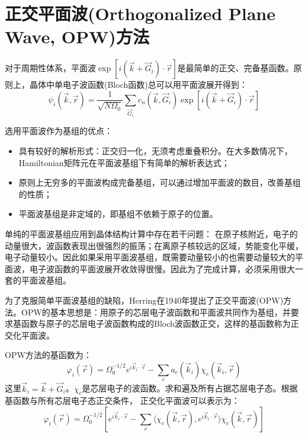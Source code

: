 \section{正交平面波(Orthogonalized Plane Wave, OPW)方法}
对于周期性体系，平面波$\exp[i(\vec k+\vec G_i)\cdot\vec r]$是最简单的正交、完备基函数。原则上，晶体中单电子波函数(Bloch函数)总可以用平面波展开得到：
\begin{equation}
  \psi_i(\vec k,\vec r)=\frac1{\sqrt{N\Omega_0}}\sum_{\vec G_i}c_n(\vec k,\vec G_i)\exp[i(\vec k+\vec G_i)\cdot\vec r]
  \label{eq:solid-84}
\end{equation}

选用平面波作为基组的优点：
\begin{itemize}
	\item 具有较好的解析形式：正交归一化，无须考虑重叠积分。在大多数情况下， Hamiltonian矩阵元在平面波基组下有简单的解析表达式；
	\item 原则上无穷多的平面波构成完备基组，可以通过增加平面波的数目，改善基组的性质；
	\item 平面波基组是非定域的，即基组不依赖于原子的位置。
\end{itemize}

单纯的平面波基组应用到晶体结构计算中存在若干问题：%
在原子核附近，电子的动量很大，波函数表现出很强烈的振荡；在离原子核较远的区域，势能变化平缓，电子动量较小。因此如果采用平面波基组，既需要动量较小的也需要动量较大的平面波，电子波函数的平面波展开收敛得很慢。因此为了完成计算，必须采用很大一套的平面波基组。

为了克服简单平面波基组的缺陷，Herring在1940年提出了正交平面波(OPW)方法\cite{PR57-1169_1940}。OPW的基本思想是：用原子的芯层电子波函数和平面波共同作为基组，并要求基函数与原子的芯层电子波函数构成的Bloch波函数正交，这样的基函数称为正交化平面波。

OPW方法的基函数为：
\begin{equation}
  \varphi_i(\vec r)=\Omega_0^{-1/2}e^{i\vec k_i\cdot\vec r}-\sum_ca_c(\vec k_i)\chi_c(\vec k_i,\vec r)
  \label{eq:OPW-set}
\end{equation}
这里$\vec k_i=\vec k+\vec G_i$。$\chi_c$是芯层电子的波函数。求和遍及所有占据芯层电子态。根据基函数与所有芯层电子态正交条件，
正交化平面波可以表示为：
\begin{equation}
  \varphi_i(\vec r)=\Omega_0^{-1/2}\left[e^{i\vec k_i\cdot\vec r}-\sum_c\langle\chi_c(\vec k,\vec r),e^{i\vec k_i\cdot\vec r}\rangle\chi_c(\vec k,\vec r)\right]
  \label{eq:solid-85}
\end{equation}

